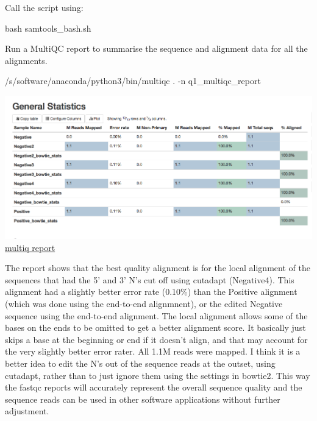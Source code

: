 \documentclass[]{article}
\newenvironment{Shaded}{\begin{snugshade}}{\end{snugshade}}
\newcommand{\FunctionTok}[1]{\textcolor[rgb]{0.00,0.00,0.00}{#1}}
\newcommand{\ExtensionTok}[1]{#1}
\newcommand{\NormalTok}[1]{#1}
\begin{document}
Call the script using:

\begin{Shaded}
\begin{Highlighting}[]
\FunctionTok{bash}\NormalTok{ samtools_bash.sh}
\end{Highlighting}
\end{Shaded}

Run a MultiQC report to summarise the sequence and alignment data for
all the alignments.

\begin{Shaded}
\begin{Highlighting}[]
\ExtensionTok{/s/software/anaconda/python3/bin/multiqc}\NormalTok{ . -n q1_multiqc_report}
\end{Highlighting}
\end{Shaded}

\includegraphics{MultiQCstats_Q1.png}\\
\href{/d/projects/u/sj003/results_cw1/q1_multiqc_report.html}{multiq
report}

The report shows that the best quality alignment is for the local
alignment of the sequences that had the 5' and 3' N's cut off using
cutadapt (Negative4). This alignment had a slightly better error rate
(0.10\%) than the Positive alignment (which was done using the
end-to-end alignmnent), or the edited Negative sequence using the
end-to-end alignment. The local alignment allows some of the bases on
the ends to be omitted to get a better alignment score. It basically
just skips a base at the beginning or end if it doesn't align, and that
may account for the very slightly better error rater. All 1.1M reads
were mapped. I think it is a better idea to edit the N's out of the
sequence reads at the outset, using cutadapt, rather than to just ignore
them using the settings in bowtie2. This way the fastqc reports will
accurately represent the overall sequence quality and the sequence reads
can be used in other software applications without further adjustment.
\end{document}
